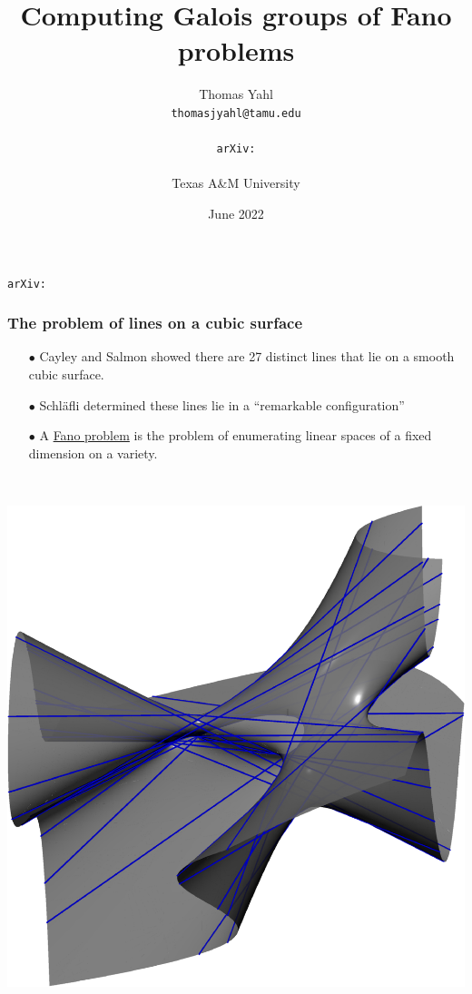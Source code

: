 \documentclass{beamer}
\title{Computing Galois groups of Fano problems}
\author{Thomas Yahl\\  \texttt{thomasjyahl@tamu.edu}\\ \vspace{-.1cm} \\ \texttt{arXiv:}\\ \vspace{-.1cm} \\ Texas A\&M University}
\date{June 2022}
\theoremstyle{definition}
\newcommand{\blue}[1]{{\color{black!10!blue}\underline{#1}}}
\begin{document}
\begin{frame}
\titlepage

\texttt{arXiv:}
\end{frame}


\begin{frame}
\frametitle{The problem of lines on a cubic surface}
\hspace{-.8cm}
\begin{minipage}{.55\textwidth}
\begin{enumerate}
\item[$\bullet$] Cayley and Salmon showed there are 27 distinct lines that lie on a smooth cubic surface.

\item[$\bullet$] Schl\"{a}fli determined these lines lie in a ``remarkable configuration'' 

\item[$\bullet$] A \blue{Fano problem} is the problem of enumerating linear spaces of a fixed dimension on a variety.
\end{enumerate}
\end{minipage}
%
\begin{minipage}{.02\textwidth}
~
\end{minipage}
%
\begin{minipage}{.4\textwidth}
\begin{center}
\includegraphics[scale=.32]{figures/27lines.pdf}
\end{center}
\end{minipage}


\end{frame}
\end{document}

